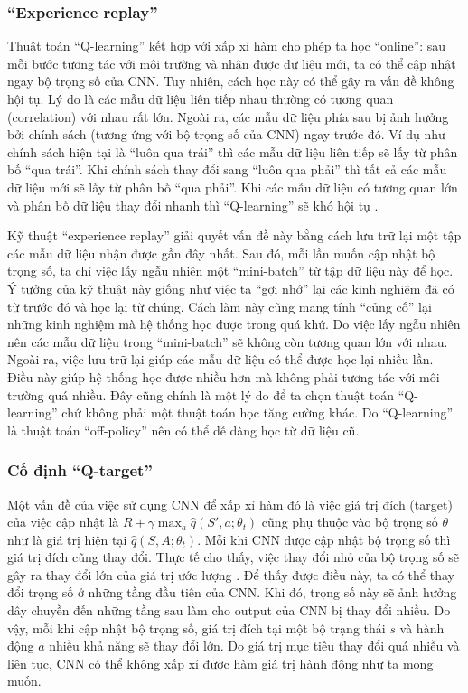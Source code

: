 \subsubsection*{``Experience replay''}
	Thuật toán ``Q-learning'' kết hợp với xấp xỉ hàm cho phép ta học ``online'': sau mỗi bước tương tác với môi trường và nhận được dữ liệu mới, ta có thể cập nhật ngay bộ trọng số của CNN.
	Tuy nhiên, cách học này có thể gây ra vấn đề không hội tụ.
	Lý do là các mẫu dữ liệu liên tiếp nhau thường có tương quan (correlation) với nhau rất lớn.
	Ngoài ra, các mẫu dữ liệu phía sau bị ảnh hưởng bởi chính sách (tương ứng với bộ trọng số của CNN) ngay trước đó.
	Ví dụ như chính sách hiện tại là ``luôn qua trái'' thì các mẫu dữ liệu liên tiếp sẽ lấy từ phân bố ``qua trái''.
	Khi chính sách thay đổi sang ``luôn qua phải'' thì tất cả các mẫu dữ liệu mới sẽ lấy từ phân bố ``qua phải''.
	Khi các mẫu dữ liệu có tương quan lớn và phân bố dữ liệu thay đổi nhanh thì ``Q-learning'' sẽ khó hội tụ \cite{mnihdqn2015}.
	
	Kỹ thuật ``experience replay'' \cite{lin1993reinforcement} giải quyết vấn đề này bằng cách lưu trữ lại một tập các mẫu dữ liệu nhận được gần đây nhất.
	Sau đó, mỗi lần muốn cập nhật bộ trọng số, ta chỉ việc lấy ngẫu nhiên một ``mini-batch'' từ tập dữ liệu này để học.
	Ý tưởng của kỹ thuật này giống như việc ta ``gợi nhớ'' lại các kinh nghiệm đã có từ trước đó và học lại từ chúng.
	Cách làm này cũng mang tính ``củng cố'' lại những kinh nghiệm mà hệ thống học được trong quá khứ.
	Do việc lấy ngẫu nhiên nên các mẫu dữ liệu trong ``mini-batch'' sẽ không còn tương quan lớn với nhau.
	Ngoài ra, việc lưu trữ lại giúp các mẫu dữ liệu có thể được học lại nhiều lần.
	Điều này giúp hệ thống học được nhiều hơn mà không phải tương tác với môi trường quá nhiều.
	Đây cũng chính là một lý do để ta chọn thuật toán ``Q-learning'' chứ không phải một thuật toán học tăng cường khác.
	Do ``Q-learning'' là thuật toán ``off-policy'' nên có thể dễ dàng học từ dữ liệu cũ.
	
\subsubsection*{Cố định ``Q-target''}
	Một vấn đề của việc sử dụng CNN để xấp xỉ hàm đó là việc giá trị đích (target) của việc cập nhật là $R + \gamma \max_{a}\hat{q}(S', a;\theta_t)$ cũng phụ thuộc vào bộ trọng số $\theta$ như là giá trị hiện tại $\hat{q}(S, A;\theta_t)$.
	Mỗi khi CNN được cập nhật bộ trọng số thì giá trị đích cũng thay đổi.
	Thực tế cho thấy, việc thay đổi nhỏ của bộ trọng số sẽ gây ra thay đổi lớn của giá trị ước lượng \cite{mnih2013playing}.
	Để thấy được điều này, ta có thể thay đổi trọng số ở những tầng đầu tiên của CNN.
	Khi đó, trọng số này sẽ ảnh hưởng dây chuyền đến những tầng sau làm cho output của CNN bị thay đổi nhiều.
	Do vậy, mỗi khi cập nhật bộ trọng số, giá trị đích tại một bộ trạng thái $s$ và hành động $a$ nhiều khả năng sẽ thay đổi lớn.
	Do giá trị mục tiêu thay đổi quá nhiều và liên tục, CNN có thể không xấp xỉ được hàm giá trị hành động như ta mong muốn.
	
